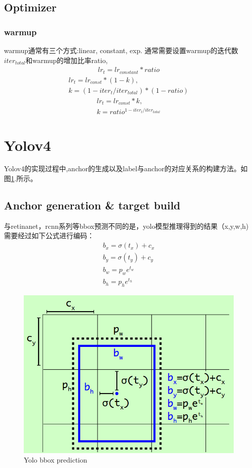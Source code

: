\documentclass{article}
\begin{document}
\subsection{Optimizer}
\subsubsection{warmup}
warmup通常有三个方式:linear, constant, exp. 通常需要设置warmup的迭代数$iter_{total}$和warmup的增加比率ratio,
\begin{align}
lr_t = lr_{constant}*ratio
\end{align}
\begin{equation}
\begin{aligned}
lr_t = lr_{const}*(1-k), \\
k= (1-iter_t /iter_{total}) * (1-ratio)
\end{aligned}
\end{equation}
\begin{align}
lr_t = lr_{const}*k, \\
k=ratio^{1-iter_t/iter_{total}}
\end{align}

\section{Yolov4}
Yolov4的实现过程中,anchor的生成以及label与anchor的对应关系的构建方法。如图\ref{Fig.yolo_bbox}.所示。
\subsection{Anchor generation \& target build}
与retinanet，rcnn系列等bbox预测不同的是，yolo模型推理得到的结果（x,y,w,h)需要经过如下公式进行编码：
\begin{equation}
\begin{aligned}
b_x = \sigma(t_x)+c_x \\
b_y = \sigma(t_y)+c_y \\
b_w = p_we^{t_w} \\
b_h = p_he^{t_h}
\end{aligned}
\end{equation}
\begin{figure}[htp!]
\centering
\includegraphics[scale=0.3]{images/yolo_bbox.png}
\caption{Yolo bbox prediction}
\label{Fig.yolo_bbox}
\end{figure}
\end{document}
